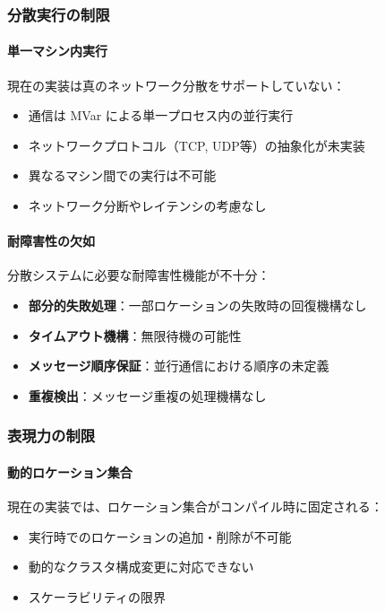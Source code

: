 \subsubsection{分散実行の制限}

\paragraph{単一マシン内実行}
現在の実装は真のネットワーク分散をサポートしていない：
\begin{itemize}
\item 通信は MVar による単一プロセス内の並行実行
\item ネットワークプロトコル（TCP, UDP等）の抽象化が未実装
\item 異なるマシン間での実行は不可能
\item ネットワーク分断やレイテンシの考慮なし
\end{itemize}

\paragraph{耐障害性の欠如}
分散システムに必要な耐障害性機能が不十分：
\begin{itemize}
\item \textbf{部分的失敗処理}：一部ロケーションの失敗時の回復機構なし
\item \textbf{タイムアウト機構}：無限待機の可能性
\item \textbf{メッセージ順序保証}：並行通信における順序の未定義
\item \textbf{重複検出}：メッセージ重複の処理機構なし
\end{itemize}

\subsubsection{表現力の制限}

\paragraph{動的ロケーション集合}
現在の実装では、ロケーション集合がコンパイル時に固定される：
\begin{itemize}
\item 実行時でのロケーションの追加・削除が不可能
\item 動的なクラスタ構成変更に対応できない
\item スケーラビリティの限界
\end{itemize}

